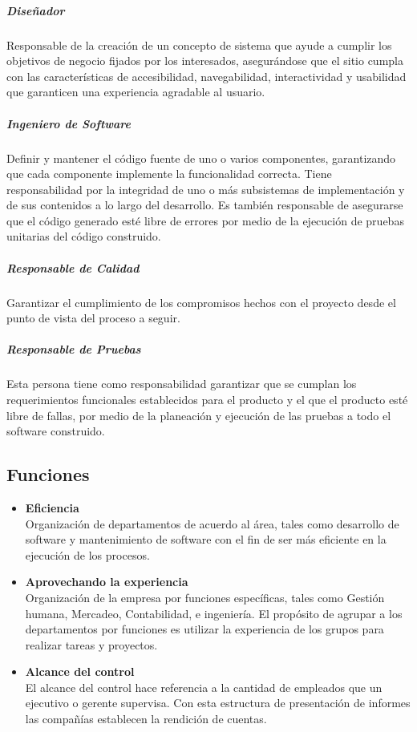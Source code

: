 \subparagraph{Diseñador}
Responsable de la creación de un concepto de sistema que ayude a cumplir los objetivos de negocio fijados por los interesados, asegurándose que el sitio cumpla con las características de accesibilidad, navegabilidad, interactividad y usabilidad que garanticen una experiencia agradable al usuario. 
\subparagraph{Ingeniero de Software}
Definir y mantener el código fuente de uno o varios componentes, garantizando que cada componente implemente la funcionalidad correcta. Tiene responsabilidad por la integridad de uno o más subsistemas de implementación y de sus contenidos a lo largo del desarrollo. Es también responsable de asegurarse que el código generado esté libre de errores por medio de la ejecución de pruebas unitarias del código construido.
\subparagraph{Responsable de Calidad}
Garantizar el cumplimiento de los compromisos hechos con el proyecto desde el punto de vista del proceso a seguir. 

\subparagraph{Responsable de Pruebas}
Esta persona tiene como responsabilidad garantizar que se cumplan los requerimientos funcionales establecidos para el producto y el que el producto esté libre de fallas, por medio de la planeación y ejecución de las pruebas a todo el software construido. 


\subsection{Funciones}
\begin{itemize}
\item \textbf{Eficiencia}\\
Organización de departamentos de acuerdo al área, tales como desarrollo de software y mantenimiento de software con el fin de ser más eficiente en la ejecución de los procesos.
\item \textbf{Aprovechando la experiencia}\\
Organización de la empresa por funciones específicas, tales como Gestión humana, Mercadeo, Contabilidad, e ingeniería. El propósito de agrupar a los departamentos por funciones es utilizar la experiencia de los grupos para realizar tareas y proyectos.

\item \textbf{Alcance del control}\\
El alcance del control hace referencia a la cantidad de empleados que un ejecutivo o gerente supervisa. Con esta estructura de presentación de informes las compañías establecen la rendición de cuentas.

\end{itemize}

